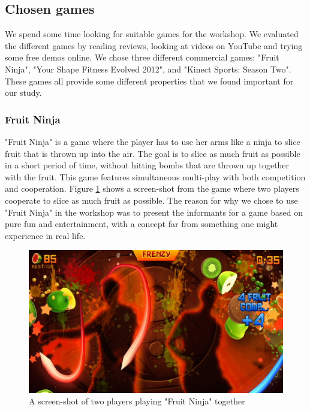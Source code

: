 \subsection{Chosen games}
\label{sec:chosengames}
We spend some time looking for suitable games for the workshop. We evaluated the different games by reading reviews, looking at videos on YouTube and trying some free demos online. We chose three different commercial games: "Fruit Ninja", "Your Shape Fitness Evolved 2012", and "Kinect Sports: Season Two". These games all provide some different properties that we found important for our study.  

\subsubsection{Fruit Ninja}
"Fruit Ninja" is a game where the player has to use her arms like a ninja to slice fruit that is thrown up into the air. The goal is to slice as much fruit as possible in a short period of time, without hitting bombs that are thrown up together with the fruit. This game features simultaneous multi-play with both competition and cooperation. Figure \ref{fig:fruitninja} shows a screen-shot from the game where two players cooperate to slice as much fruit as possible. The reason for why we chose to use "Fruit Ninja" in the workshop was to present the informants for a game based on pure fun and entertainment, with a concept far from something one might experience in real life. 

\begin{figure} [H]
\centering
\includegraphics[scale=0.4]{fruitninja}
\caption[Fruit Ninja Multi-Play]{A screen-shot of two players playing "Fruit Ninja" together \cite{fruitninja}}
\label{fig:fruitninja}
\end{figure}

